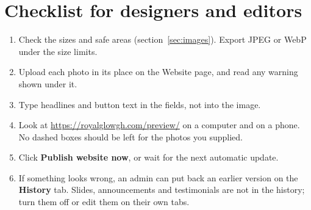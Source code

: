 \documentclass[11pt,a4paper]{article}
\newcommand{\tab}[1]{\textsf{\textbf{#1}}}
\begin{document}
\section{Checklist for designers and editors}
\begin{enumerate}
  \item Check the sizes and safe areas (section~\ref{sec:images}). Export JPEG or WebP under the size limits.
  \item Upload each photo in its place on the Website page, and read any warning shown under it.
  \item Type headlines and button text in the fields, not into the image.
  \item Look at \url{https://royalglowgh.com/preview/} on a computer and on a phone. No dashed boxes should be left for the photos you supplied.
  \item Click \tab{Publish website now}, or wait for the next automatic update.
  \item If something looks wrong, an admin can put back an earlier version on the \tab{History} tab. Slides, announcements and testimonials are not in the history; turn them off or edit them on their own tabs.
\end{enumerate}
\end{document}
